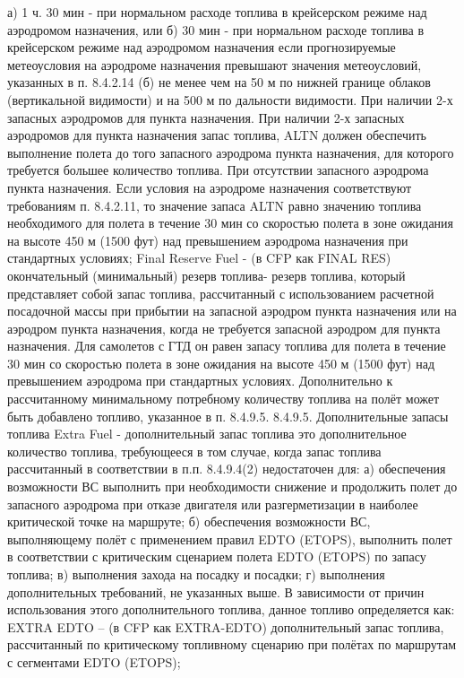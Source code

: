 а)	1 ч. 30 мин - при нормальном расходе топлива в крейсерском режиме над аэродромом назначения, или 
б)	30 мин - при нормальном расходе топлива в крейсерском режиме над аэродромом назначения если прогнозируемые метеоусловия на аэродроме назначения превышают значения метеоусловий, указанных в п. 8.4.2.14 (б) не менее чем на 50 м по нижней границе облаков (вертикальной видимости) и на 500 м по дальности видимости. 
При наличии 2-х запасных аэродромов для пункта назначения. 
При наличии 2-х запасных аэродромов для пункта назначения запас топлива, ALTN должен обеспечить выполнение полета до того запасного аэродрома пункта назначения, для которого требуется большее количество топлива. 
При отсутствии запасного аэродрома пункта назначения. 
Если условия на аэродроме назначения соответствуют требованиям п. 8.4.2.11, то значение запаса ALTN равно значению топлива необходимого для полета в течение 30 мин со скоростью полета в зоне ожидания на высоте 450 м (1500 фут) над превышением аэродрома назначения при стандартных условиях;
Final Reserve Fuel - (в CFP как FINAL RES) окончательный (минимальный) резерв топлива- резерв топлива, который представляет собой запас топлива, рассчитанный с использованием расчетной посадочной массы при прибытии на запасной аэродром пункта назначения или на аэродром пункта назначения, когда не требуется запасной аэродром для пункта назначения. Для самолетов с ГТД он равен запасу топлива для полета в течение 30 мин со скоростью полета в зоне ожидания на высоте 450 м (1500 фут) над превышением аэродрома при стандартных условиях.
Дополнительно к рассчитанному минимальному потребному количеству топлива на полёт может быть добавлено топливо, указанное в п. 8.4.9.5.
8.4.9.5. Дополнительные запасы топлива
Extra Fuel - дополнительный запас топлива это дополнительное количество топлива, требующееся в том случае, когда запас топлива рассчитанный в соответствии в п.п. 8.4.9.4(2) недостаточен для:
а)	обеспечения возможности ВС выполнить при необходимости снижение и продолжить полет до запасного аэродрома при отказе двигателя или разгерметизации в наиболее критической точке на маршруте; 
б)	обеспечения возможности ВС, выполняющему полёт с применением правил EDTO (ETOPS), выполнить полет в соответствии с критическим сценарием полета EDTO (ETOPS) по запасу топлива; 
в)	выполнения захода на посадку и посадки; 
г)	выполнения дополнительных требований, не указанных выше.
В зависимости от причин использования этого дополнительного топлива, данное топливо определяется как: 
EXTRA EDTO – (в CFP как EXTRA-EDTO) дополнительный запас топлива, рассчитанный по критическому топливному сценарию при полётах по маршрутам с сегментами EDTO (ETOPS); 
